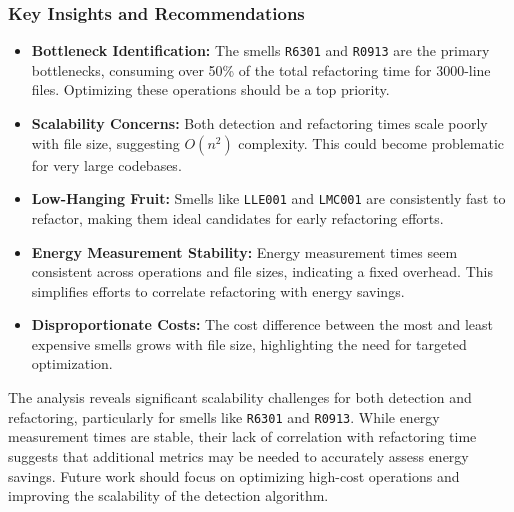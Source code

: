 \documentclass[12pt, titlepage]{article}
\begin{document}
\subsubsection{Key Insights and Recommendations}
\begin{itemize}
  \item \textbf{Bottleneck Identification:} The smells \texttt{R6301}
    and \texttt{R0913} are the primary bottlenecks, consuming over
    50\% of the total refactoring time for 3000-line files.
    Optimizing these operations should be a top priority.
  \item \textbf{Scalability Concerns:} Both detection and refactoring
    times scale poorly with file size, suggesting \(O(n^2)\)
    complexity. This could become problematic for very large codebases.
  \item \textbf{Low-Hanging Fruit:} Smells like \texttt{LLE001} and
    \texttt{LMC001} are consistently fast to refactor, making them
    ideal candidates for early refactoring efforts.
  \item \textbf{Energy Measurement Stability:} Energy measurement
    times seem consistent across operations and file sizes,
    indicating a fixed overhead. This simplifies efforts to correlate
    refactoring with energy savings.
  \item \textbf{Disproportionate Costs:} The cost difference between
    the most and least expensive smells grows with file size,
    highlighting the need for targeted optimization.
\end{itemize}

The analysis reveals significant scalability challenges for both
detection and refactoring, particularly for smells like
\texttt{R6301} and \texttt{R0913}. While energy measurement times are
stable, their lack of correlation with refactoring time suggests that
additional metrics may be needed to accurately assess energy savings.
Future work should focus on optimizing high-cost operations and
improving the scalability of the detection algorithm.
\end{document}
